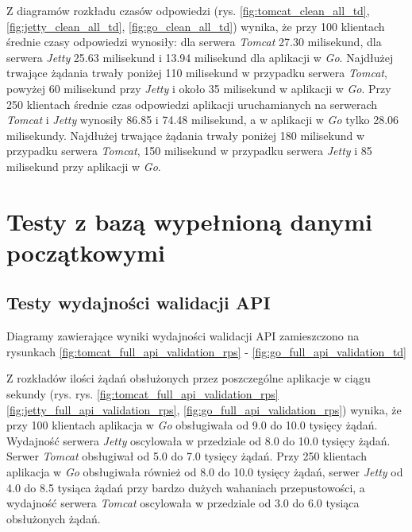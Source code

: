 Z diagramów rozkładu czasów odpowiedzi (rys. \ref{fig:tomcat_clean_all_td}, \ref{fig:jetty_clean_all_td}, \ref{fig:go_clean_all_td}) wynika, że przy 100 klientach średnie czasy odpowiedzi wynosiły: dla serwera \textsl{Tomcat} 27.30  milisekund, dla serwera \textsl{Jetty} 25.63 milisekund i 13.94 milisekund dla aplikacji w \textsl{Go}.  Najdłużej trwające żądania trwały poniżej 110 milisekund w przypadku serwera \textsl{Tomcat}, powyżej 60 milisekund przy \textsl{Jetty} i około 35 milisekund  w aplikacji w \textsl{Go}. Przy 250 klientach średnie czas odpowiedzi aplikacji uruchamianych na serwerach \textsl{Tomcat} i \textsl{Jetty} wynosiły 86.85 i 74.48 milisekund, a w aplikacji w \textsl{Go} tylko 28.06 milisekundy. Najdłużej trwające żądania trwały poniżej 180 milisekund w przypadku serwera \textsl{Tomcat}, 150 milisekund w przypadku serwera \textsl{Jetty} i 85 milisekund przy aplikacji w \textsl{Go}.


\clearpage

\newpage
\section{Testy z bazą wypełnioną danymi początkowymi}
\subsection{Testy wydajności walidacji API}
Diagramy zawierające wyniki wydajności walidacji API zamieszczono na rysunkach \ref{fig:tomcat_full_api_validation_rps} - \ref{fig:go_full_api_validation_td}

Z rozkładów ilości żądań obsłużonych przez poszczególne aplikacje w ciągu sekundy (rys. rys. \ref{fig:tomcat_full_api_validation_rps} \ref{fig:jetty_full_api_validation_rps}, \ref{fig:go_full_api_validation_rps}) wynika, że przy 100 klientach aplikacja  w \textsl{Go} obsługiwała od 9.0 do 10.0 tysięcy żądań. Wydajność serwera  \textsl{Jetty} oscylowała w przedziale od 8.0 do 10.0 tysięcy żądań. Serwer \textsl{Tomcat} obsługiwał od 5.0 do 7.0 tysięcy żądań. Przy 250 klientach aplikacja w \textsl{Go} obsługiwała również od 8.0 do 10.0 tysięcy żądań, serwer \textsl{Jetty} od 4.0 do 8.5 tysiąca żądań przy bardzo dużych wahaniach przepustowości, a wydajność serwera \textsl{Tomcat} oscylowała w przedziale od 3.0 do 6.0 tysiąca obsłużonych żądań. 
 
